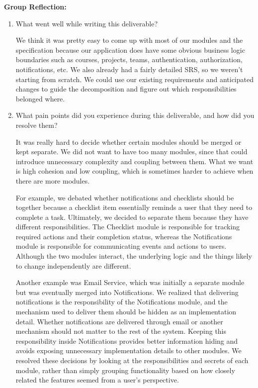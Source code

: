 \documentclass[12pt, titlepage]{article}
\begin{document}


\textbf{Group Reflection: }
\begin{enumerate}
  \item What went well while writing this deliverable?

  We think it was pretty easy to come up with most of our modules and the specification because our
  application does have some obvious business logic boundaries such as courses, projects, teams, authentication,
  authorization, notifications, etc. We also already had a fairly detailed SRS, so we weren't starting from scratch.
  We could use our existing requirements and anticipated changes to guide the decomposition and figure out which responsibilities belonged where.

  \item What pain points did you experience during this deliverable, and how
    did you resolve them?

  It was really hard to decide whether certain modules should be merged or kept separate.
  We did not want to have too many modules, since that could introduce unnecessary complexity and coupling
  between them. What we want is high cohesion and low coupling, which is sometimes harder to achieve when
  there are more modules.

  For example, we debated whether notifications and checklists should be together because a checklist
  item essentially reminds a user that they need to complete a task. Ultimately, we decided to separate
  them because they have different responsibilities. The Checklist module is responsible for tracking required
  actions and their completion status, whereas the Notifications module is responsible for communicating
  events and actions to users. Although the two modules interact, the underlying logic and the things
  likely to change independently are different.

  Another example was Email Service, which was initially a separate module but was eventually merged into
  Notifications. We realized that delivering notifications is the responsibility of the Notifications module,
  and the mechanism used to deliver them should be hidden as an implementation detail.
  Whether notifications are delivered through email or another mechanism should not matter to the rest of the system.
  Keeping this responsibility inside Notifications provides better information hiding and avoids exposing
  unnecessary implementation details to other modules.
  We resolved these decisions by looking at the responsibilities and secrets of each module,
  rather than simply grouping functionality based on how closely related the features seemed from a user's perspective.


\end{enumerate}
\end{document}
